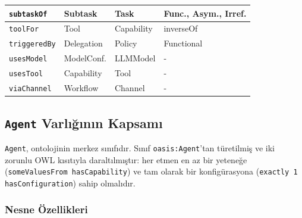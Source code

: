\documentclass[10pt, a4paper, twocolumn]{article}
\begin{document}
\begin{center}
\begin{tabular}{|p{2.1cm}|p{1.4cm}|p{1.4cm}|p{1.5cm}|}
\hline
\texttt{subtaskOf} & Subtask & Task & Func., Asym., Irref. \\
\hline
\texttt{toolFor} & Tool & Capability & inverseOf \\
\hline
\texttt{triggeredBy} & Delegation & Policy & Functional \\
\hline
\texttt{usesModel} & ModelConf. & LLMModel & {-} \\
\hline
\texttt{usesTool} & Capability & Tool & {-} \\
\hline
\texttt{viaChannel} & Workflow & Channel & {-} \\
\hline
\end{tabular}
\label{tab:all-objprop}
\end{center}

\subsection{\texttt{Agent} Varlığının Kapsamı}

\texttt{Agent}, ontolojinin merkez sınıfıdır. Sınıf \texttt{oasis:Agent}'tan türetilmiş ve iki zorunlu OWL kısıtıyla daraltılmıştır: her etmen en az bir yeteneğe (\texttt{someValuesFrom hasCapability}) ve tam olarak bir konfigürasyona (\texttt{exactly~1 hasConfiguration}) sahip olmalıdır.

\subsubsection*{Nesne Özellikleri}
\end{document}
